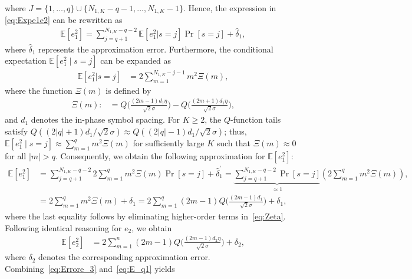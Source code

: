 \documentclass[journal,12pt,onecolumn,draftclsnofoot]{IEEEtran}
\theoremstyle{definition}
\begin{document}
where $J = \{1,\ldots, q\} \cup \{N_{1,K}-q-1, \ldots, N_{1,K}-1\}$. Hence, the expression in \eqref{eq:Expe1e2} can be rewritten as
\begin{align*}
    \mathbb{E}[e_1^2]  = \sum\nolimits_{j=q+1}^{N_{1,K}-q-2}\mathbb{E}[e_1^2|s=j]\Pr[s=j] + \hat{\delta}_1,
\end{align*}
where $\hat{\delta}_1$ represents the approximation error. Furthermore, the conditional expectation $\mathbb{E}[e_1^2 \mid s = j]$ can be expanded as
\begin{align}\label{eq:Expzet}
\mathbb{E}[e_1^2|s=j] & = 2\sum\nolimits_{m=1}^{N_{1,K}-j-1} m^2  \Xi(m), 
\end{align}
where the function $\Xi(m)$ is defined by
\begin{align}\label{eq:Zeta}
\Xi(m): & =  Q\Big(\frac{(2m-1)d_1 \eta}{\sqrt{2}\sigma}\Big) - Q\Big(\frac{(2m+1)d_1\eta}{\sqrt{2}\sigma}\Big),
\end{align}
and $d_1$ denotes the in-phase symbol spacing.  
For $K \ge 2$, the $Q$-function tails satisfy 
$Q((2|q| + 1)d_1 / \sqrt{2}\sigma) \approx Q((2|q| - 1)d_1 / \sqrt{2}\sigma)$; thus, 
$\mathbb{E}[e_1^2 \mid s = j] \approx \sum_{m = 1}^{q} m^2 \Xi(m)$ 
for sufficiently large $K$ such that $\Xi(m) \approx 0$ for all $|m| > q$.  
Consequently, we obtain the following approximation for $\mathbb{E}[e_1^2]$:
\begin{align}
       \nonumber
       \mathbb{E}[e_1^2] & =  \sum\nolimits_{j=q+1}^{N_{1,K}-q-2}2\sum\nolimits_{m=1}^{q} m^2  \Xi(m)\Pr[s=j] + \hat{\delta}_1^{'}= \underbrace{\sum\nolimits_{j=q+1}^{N_{1,K}-q-2}\Pr[s=j]}_{\approx 1} (2\sum\nolimits_{m=1}^{q} m^2  \Xi(m)), \\
       &= 2\sum\nolimits_{m=1}^{q} m^2  \Xi(m) + \delta_1 = 2\sum_{m=1}^{q}(2m -1)Q\Big(\frac{(2m-1)d_1}{\sqrt{2}\sigma}\Big)+ \delta_1,
       \label{eq:Errore_3}
\end{align}
where the last equality follows by eliminating higher-order terms in~\eqref{eq:Zeta}.  
Following identical reasoning for $e_2$, we obtain
\begin{align}\label{eq:E_q1}
    \mathbb{E}[e_2^2] &  = 2 \sum_{m=1}^{n}(2m -1)Q\Big(\frac{(2m-1)d_2 \eta }{\sqrt{2}\sigma}\Big)+ \delta_2,
\end{align} 
where $\delta_2$ denotes the corresponding approximation error.  
Combining~\eqref{eq:Errore_3} and~\eqref{eq:E_q1} yields 
\end{document}
